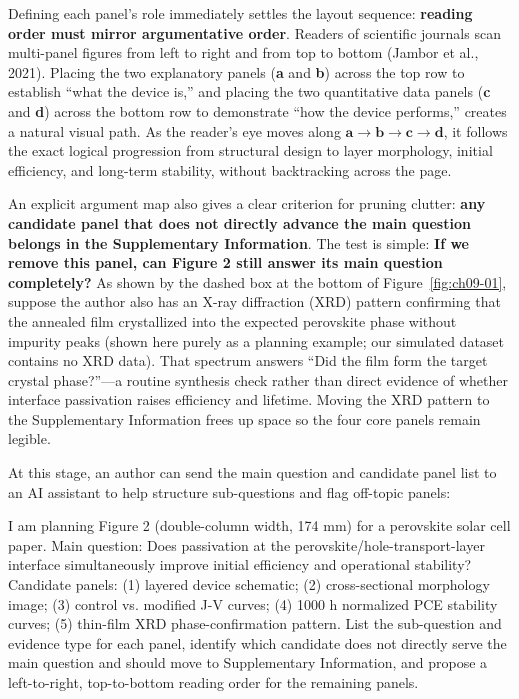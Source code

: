 Defining each panel's role immediately settles the layout sequence: \textbf{reading order must mirror argumentative order}. Readers of scientific journals scan multi-panel figures from left to right and from top to bottom (Jambor et al., 2021). Placing the two explanatory panels (\textbf{a} and \textbf{b}) across the top row to establish ``what the device is,'' and placing the two quantitative data panels (\textbf{c} and \textbf{d}) across the bottom row to demonstrate ``how the device performs,'' creates a natural visual path. As the reader's eye moves along $\textbf{a} \rightarrow \textbf{b} \rightarrow \textbf{c} \rightarrow \textbf{d}$, it follows the exact logical progression from structural design to layer morphology, initial efficiency, and long-term stability, without backtracking across the page.

An explicit argument map also gives a clear criterion for pruning clutter: \textbf{any candidate panel that does not directly advance the main question belongs in the Supplementary Information}. The test is simple: \textbf{If we remove this panel, can Figure 2 still answer its main question completely?} As shown by the dashed box at the bottom of Figure~\ref{fig:ch09-01}, suppose the author also has an X-ray diffraction (XRD) pattern confirming that the annealed film crystallized into the expected perovskite phase without impurity peaks (shown here purely as a planning example; our simulated dataset contains no XRD data). That spectrum answers ``Did the film form the target crystal phase?''---a routine synthesis check rather than direct evidence of whether interface passivation raises efficiency and lifetime. Moving the XRD pattern to the Supplementary Information frees up space so the four core panels remain legible.

At this stage, an author can send the main question and candidate panel list to an AI assistant to help structure sub-questions and flag off-topic panels:

\begin{Prompt}
I am planning Figure 2 (double-column width, 174 mm) for a perovskite solar cell paper.
Main question: Does passivation at the perovskite/hole-transport-layer interface
simultaneously improve initial efficiency and operational stability?
Candidate panels: (1) layered device schematic; (2) cross-sectional morphology image;
(3) control vs. modified J-V curves; (4) 1000 h normalized PCE stability curves;
(5) thin-film XRD phase-confirmation pattern.
List the sub-question and evidence type for each panel, identify which candidate does
not directly serve the main question and should move to Supplementary Information, and
propose a left-to-right, top-to-bottom reading order for the remaining panels.
\end{Prompt}

